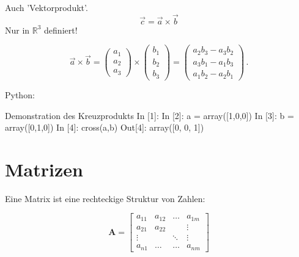 Auch 'Vektorprodukt'. 
$$ \vec{c} = \vec{a} \times \vec{b}$$
Nur in $\mathbb{R}^3$ definiert!


\begin{equation}
{\displaystyle {\vec {a}}\times {\vec {b}}={\begin{pmatrix}a_{1}\\a_{2}\\a_{3}\end{pmatrix}}\times {\begin{pmatrix}b_{1}\\b_{2}\\b_{3}\end{pmatrix}}={\begin{pmatrix}a_{2}b_{3}-a_{3}b_{2}\\a_{3}b_{1}-a_{1}b_{3}\\a_{1}b_{2}-a_{2}b_{1}\end{pmatrix}}\,.}
\end{equation}

Python: 
\begin{python}{Demonstration des Kreuzprodukts}
In [1]: %
In [2]: a = array([1,0,0])
In [3]: b = array([0,1,0])
In [4]: cross(a,b)
Out[4]: array([0, 0, 1])
\end{python}



\section{Matrizen}



Eine Matrix ist eine rechteckige Struktur von Zahlen:


\begin{equation}
\mathbf{A} = \begin{bmatrix} a_{11} & a_{12} & \dots & a_{1m} \\
                    a_{21} & a_{22} &       &  \vdots   \\
                    \vdots &        &\ddots &  \vdots \\
                    a_{n 1} & \dots & \dots & a_{n m}
 \end{bmatrix}
\end{equation}



